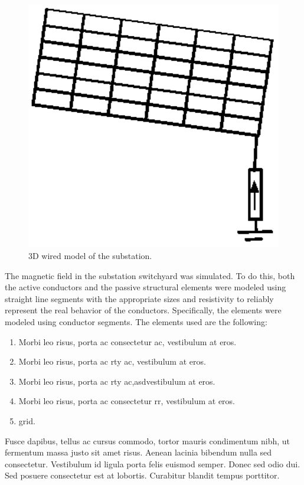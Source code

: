 \documentclass[journal]{../template/IEEEtran}
\begin{document}
\begin{figure}[h]
	\centering
		\includegraphics[width=6.1in]{../resources/image.eps}
	\caption{3D wired model of the substation.}
	\label{fig:substationwire}
\end{figure}

The magnetic field in the substation switchyard was simulated. To do this, both the active conductors and the passive structural elements were modeled using straight line segments with the appropriate sizes and resistivity to reliably represent the real behavior of the conductors.  Specifically, the elements were modeled using conductor segments. The elements used are the following:

\begin{enumerate}
	\item Morbi leo risus, porta ac consectetur ac, vestibulum at eros.
	\item Morbi leo risus, porta ac rty ac, vestibulum at eros.
	\item Morbi leo risus, porta ac rty ac,asdvestibulum at eros.	\item Morbi leo risus, porta ac consectetur rr, vestibulum at eros.
	\item grid.
\end{enumerate}


Fusce dapibus, tellus ac cursus commodo, tortor mauris condimentum nibh, ut fermentum massa justo sit amet risus. Aenean lacinia bibendum nulla sed consectetur. Vestibulum id ligula porta felis euismod semper. Donec sed odio dui. Sed posuere consectetur est at lobortis. Curabitur blandit tempus porttitor.
\end{document}
